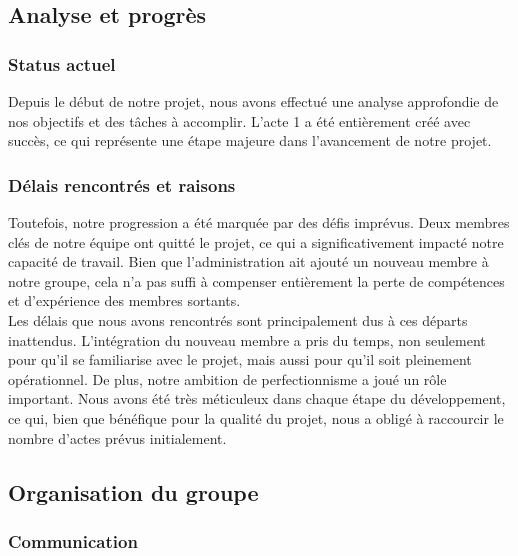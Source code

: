 

\subsection{Analyse et progrès}

\subsubsection{Status actuel}

Depuis le début de notre projet, nous avons effectué une analyse approfondie de nos objectifs et des tâches à accomplir.
L'acte 1 a été entièrement créé avec succès, ce qui représente une étape majeure dans l'avancement de notre projet.

\subsubsection{Délais rencontrés et raisons}

Toutefois, notre progression a été marquée par des défis imprévus.
Deux membres clés de notre équipe ont quitté le projet, ce qui a significativement impacté notre capacité de travail.
Bien que l'administration ait ajouté un nouveau membre à notre groupe, cela n'a pas suffi à compenser entièrement la perte de compétences et d'expérience des membres sortants.
\\


Les délais que nous avons rencontrés sont principalement dus à ces départs inattendus.
L'intégration du nouveau membre a pris du temps, non seulement pour qu'il se familiarise avec le projet, mais aussi pour qu'il soit pleinement opérationnel. De plus, notre ambition de perfectionnisme a joué un rôle important.
Nous avons été très méticuleux dans chaque étape du développement, ce qui, bien que bénéfique pour la qualité du projet, nous a obligé à raccourcir le nombre d'actes prévus initialement.
\subsection{Organisation du groupe}

\subsubsection{Communication}

